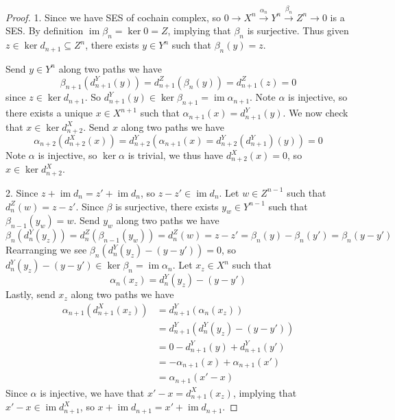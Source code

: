 \documentclass{article}
\theoremstyle{definition}
\newcommand{\im}{\operatorname{im}}
\newcommand{\xto}[1]{\xrightarrow{#1}}
\begin{document}
\begin{proof}
    \hfill

    1. Since we have SES of cochain complex, so $0 \to X^n \xto{\alpha_n} Y^n \xto{\beta_n} Z^n \to 0$ is a SES. By definition $\im \beta_n = \ker 0 = Z$, implying that $\beta_n$ is surjective. Thus given $z\in \ker d_{n+1} \subseteq Z^n$, there exists $y\in Y^n$ such that $\beta_n(y)=z$.

    Send $y\in Y^n$ along two paths we have 
    \[\beta_{n+1}(d_{n+1}^Y(y)) = d_{n+1}^Z(\beta_n(y))=d_{n+1}^Z(z)=0\]
    since $z\in \ker d_{n+1}$. So $d_{n+1}^Y(y) \in \ker \beta_{n+1} = \im \alpha_{n+1}$. Note $\alpha$ is injective, so there exists a unique $x\in X^{n+1}$ such that $\alpha_{n+1}(x)=d_{n+1}^Y(y)$. We now check that $x\in \ker d_{n+2}^X$. Send $x$ along two paths we have
    \[\alpha_{n+2}(d_{n+2}^X(x)) = d_{n+2}^Y(\alpha_{n+1}(x) = d_{n+2}^Y(d_{n+1}^Y)(y)) = 0\]
    Note $\alpha$ is injective, so $\ker \alpha$ is trivial, we thus have $d_{n+2}^X(x)= 0$, so $x\in \ker d_{n+2}^X$.

    2. Since $z+\im d_n = z' + \im d_n$, so $z-z'\in \im d_n$. Let $w\in Z^{n-1}$ such that $d_n^Z(w)=z-z'$. Since $\beta$ is surjective, there exists $y_w\in Y^{n-1}$ such that $\beta_{n-1}(y_w)=w$. Send $y_w$ along two paths we have 
    \[\beta_{n}(d_n^Y(y_z)) = d^Z_{n}(\beta_{n-1}(y_w))= d^Z_{n}(w) = z-z' = \beta_n(y)-\beta_n(y') = \beta_n(y-y')\]
    Rearranging we see $\beta_n(d_n^Y(y_z) - (y-y'))=0$, so $d_n^Y(y_z) - (y-y')\in \ker \beta_n = \im \alpha_n$. Let $x_z\in X^n$ such that 
    \[\alpha_n(x_z) = d_n^Y(y_z) - (y-y')\]
    Lastly, send $x_z$ along two paths we have
    \begin{align*}
        \alpha_{n+1}(d_{n+1}^X(x_z)) 
        &= d_{n+1}^Y(\alpha_n(x_z))\\ 
        &=d_{n+1}^Y(d_n^Y(y_z) - (y-y')) \\
        &= 0 -d_{n+1}^Y(y) + d_{n+1}^Y(y')\\
        &= -\alpha_{n+1}(x) + \alpha_{n+1}(x')\\
        &= \alpha_{n+1}(x'-x)
    \end{align*}
    Since $\alpha$ is injective, we have that $x'-x = d_{n+1}^X(x_z)$, implying that $x'-x \in \im d_{n+1}^X$, so $x + \im d_{n+1} = x' + \im d_{n+1}$.


\end{proof}
\end{document}
